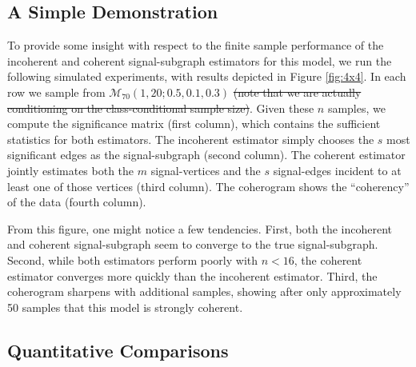 \documentclass[10pt,journal,cspaper,compsoc]{IEEEtran}
\providecommand{\mc}[1]{\mathcal{#1}}
\begin{document}
\subsection{A Simple Demonstration} %
\label{sub:a_simple_demonstration}
  

To provide some insight with respect to the finite sample performance of the incoherent and coherent signal-subgraph estimators for this model, we run the following simulated experiments, with results depicted in  Figure \ref{fig:4x4}.  In each row we sample from $\mc{M}_{70}(1,20;0.5,0.1,0.3)$  \sout{(note that we are actually conditioning on the class-conditional sample size)}.  Given these $n$ samples, we compute the significance matrix (first column), which contains the sufficient statistics for both estimators.  The incoherent estimator simply chooses the $s$ most significant edges as the signal-subgraph (second column). The coherent estimator jointly estimates both the $m$ signal-vertices and the $s$ signal-edges incident to at least one of those vertices (third column).  The coherogram shows the ``coherency'' of the data (fourth column).    

From this figure, one might notice a few tendencies.  First, both the incoherent and coherent signal-subgraph seem to converge to the true signal-subgraph.  Second, while 
both estimators perform poorly with $n < 16$, 
the coherent estimator converges more quickly than the incoherent estimator.  Third, the coherogram sharpens with additional samples,  showing after only approximately 50 samples that this model is strongly coherent.


\subsection{Quantitative Comparisons} %
\label{sub:relative_efficiencies}
\end{document}
